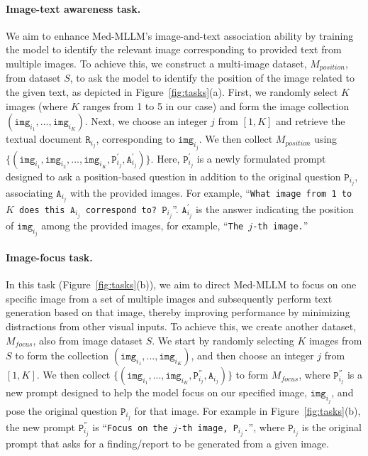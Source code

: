 \paragraph{Image-text awareness task.}
We aim to enhance Med-MLLM's image-and-text association ability by training the model to identify the relevant image corresponding to provided text from multiple images.
To achieve this, we construct a multi-image dataset, $M_{position}$, from dataset $S$, to ask the model to identify the position of the image related to the given text, as depicted in Figure~\ref{fig:tasks}(a).
First, we randomly select $K$ images (where $K$ ranges from 1 to 5 in our case) and form the image collection $(\texttt{img}_{i_1}, ..., \texttt{img}_{i_K})$.
Next, we choose an integer $j$ from $[1,K]$ and retrieve the textual document $\texttt{R}_{i_j}$, corresponding to $\texttt{img}_{i_j}$.
We then collect $M_{position}$ using $\{(\texttt{img}_{i_1}, \texttt{img}_{i_2}, ..., \texttt{img}_{i_K}, \texttt{P}^{'}_{i_j}, \texttt{A}^{'}_{i_j})\}$. 
Here, $\texttt{P}^{'}_{i_j}$ is a newly formulated prompt designed to ask a position-based question in addition to the original question $\texttt{P}_{i_j}$, associating $\texttt{A}_{i_j}$ with the provided images.
For example, ``\texttt{What image from 1 to $K$ does this $\texttt{A}_{i_j}$ correspond to? $\texttt{P}_{i_j}$}''.
$\texttt{A}^{'}_{i_j}$ is the answer indicating the position of ${\texttt{img}_{i_j}}$ among the provided images, for example, ``\texttt{The $j$-th image.}''



\paragraph{Image-focus task.}
In this task (Figure~\ref{fig:tasks}(b)), we aim to direct Med-MLLM to focus on one specific image from a set of multiple images and subsequently perform text generation based on that image, thereby improving performance by minimizing distractions from other visual inputs.
To achieve this, we create another dataset, $M_{focus}$, also from image dataset $S$.
We start by randomly selecting $K$ images from $S$ to form the collection $(\texttt{img}_{i_1}, ..., \texttt{img}_{i_K})$, and then choose an integer $j$ from $[1,K]$.
We then collect $\{(\texttt{img}_{i_1}, ..., \texttt{img}_{i_K}, \texttt{P}^{''}_{i_j}, \texttt{A}_{i_j})\}$ to form $M_{focus}$, where  $\texttt{P}^{''}_{i_j}$ is a new prompt designed to help the model focus on our specified image, $\texttt{img}_{i_j}$, and pose the original question $\texttt{P}_{i_j}$ for that image.
For example in Figure~\ref{fig:tasks}(b), the new prompt $\texttt{P}^{''}_{i_j}$ is ``\texttt{Focus on the $j$-th image, {P}$_{i_j}$.}'', where $\texttt{P}_{i_j}$ is the original prompt that asks for a finding/report to be generated from a given image.

